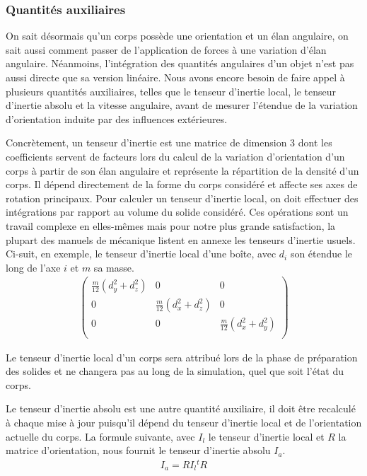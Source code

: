 \subsubsection{Quantités auxiliaires}

On sait désormais qu'un corps possède une orientation et un élan
angulaire, on sait aussi comment passer de l'application de forces à
une variation d'élan angulaire. Néanmoins, l'intégration des quantités
angulaires d'un objet n'est pas aussi directe que sa version
linéaire. Nous avons encore besoin de faire appel à plusieurs
quantités auxiliaires, telles que le tenseur d'inertie local, le
tenseur d'inertie absolu et la vitesse angulaire, avant de mesurer
l'étendue de la variation d'orientation induite par des influences
extérieures.

Concrètement, un tenseur d'inertie est une matrice de dimension 3 dont
les coefficients servent de facteurs lors du calcul de la variation
d'orientation d'un corps à partir de son élan angulaire et représente
la répartition de la densité d'un corps. Il dépend directement de la
forme du corps considéré et affecte ses axes de rotation
principaux. Pour calculer un tenseur d'inertie local, on doit
effectuer des intégrations par rapport au volume du solide
considéré. Ces opérations sont un travail complexe en elles-mêmes mais
pour notre plus grande satisfaction, la plupart des manuels de
mécanique listent en annexe les tenseurs d'inertie usuels. Ci-suit, en
exemple, le tenseur d'inertie local d'une boîte, avec $d_i$ son
étendue le long de l'axe $i$ et $m$ sa masse.
\begin{align*}
  \begin{pmatrix}
    \frac{m}{12}(d_y^2 + d_z^2) & 0 & 0 \\
    0 & \frac{m}{12}(d_x^2 + d_z^2) & 0 \\
    0 & 0 & \frac{m}{12}(d_x^2 + d_y^2) \\
  \end{pmatrix}
\end{align*}

Le tenseur d'inertie local d'un corps sera attribué lors de la phase
de préparation des solides et ne changera pas au long de la
simulation, quel que soit l'état du corps.

Le tenseur d'inertie absolu est une autre quantité auxiliaire, il doit
être recalculé à chaque mise à jour puisqu'il dépend du tenseur
d'inertie local et de l'orientation actuelle du corps. La formule
suivante, avec $I_l$ le tenseur d'inertie local et $R$ la matrice
d'orientation, nous fournit le tenseur d'inertie absolu $I_{a}$.
\begin{align*}
  I_a = R I_l {}^t\!\!R
\end{align*}

